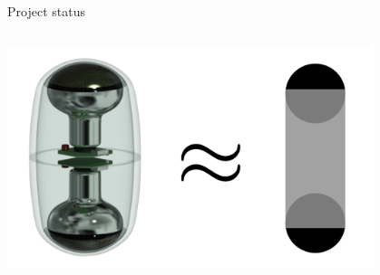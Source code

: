 \begin{frame}[fragile]{Project status}
\begin{columns}
\begin{column}{0.5\textwidth}
{        \centering\vspace{1em}
        \includegraphics[width=0.8\textwidth]{img/d-egg_approximation}
      }
    \end{column}
  \end{columns}

\end{frame}